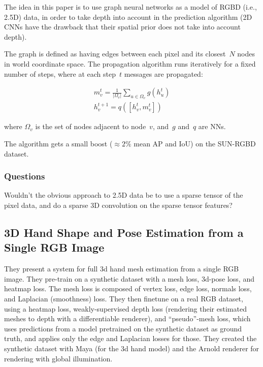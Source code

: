 \documentclass[a4paper, 12pt]{article}
\begin{document}
The idea in this paper is to use graph neural networks as a model of RGBD
(i.e., 2.5D) data, in order to take depth into account in the prediction
algorithm (2D CNNs have the drawback that their spatial prior does not take
into account depth).

The graph is defined as having edges between each pixel and its closest~$N$
nodes in world coordinate space. The propagation algorithm runs iteratively for
a fixed number of steps, where at each step~$t$ messages are propagated:

\begin{align*}
        m_v^t = \frac{1}{|\Omega_v|} \sum_{u \in \Omega_v} g(h_u^t) \\
        h_v^{t + 1} = q([h_v^t, m_v^t])
\end{align*}

where $\Omega_v$ is the set of nodes adjacent to node~$v$, and~$g$ and~$q$ are
NNs.

The algorithm gets a small boost ($\approx 2\%$ mean AP and IoU) on the
SUN-RGBD dataset.


\subsubsection{Questions}

Wouldn't the obvious approach to 2.5D data be to use a sparse tensor of the
pixel data, and do a sparse 3D convolution on the sparse tensor features?


\subsection{3D Hand Shape and Pose Estimation from a Single {RGB}
            Image~\cite{ge20193dhand}}

They present a system for full 3d hand mesh estimation from a single RGB image.
They pre-train on a synthetic dataset with a mesh loss, 3d-pose loss, and
heatmap loss.
The mesh loss is composed of vertex loss, edge loss, normals loss, and
Laplacian (smoothness) loss.
They then finetune on a real RGB dataset, using a heatmap loss,
weakly-supervised depth loss (rendering their estimated meshes to depth with a
differentiable renderer), and ``pseudo''-mesh loss, which uses predictions from
a model pretrained on the synthetic dataset as ground truth, and applies only
the edge and Laplacian losses for those.
They created the synthetic dataset with Maya (for the 3d hand model) and the
Arnold renderer for rendering with global illumination.
\end{document}
